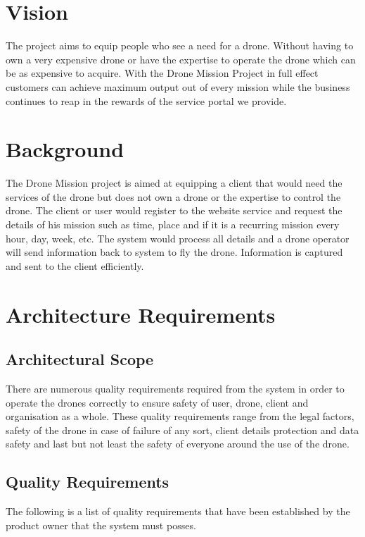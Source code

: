 \documentclass{article}
\begin{document}
	\section{Vision}%
	The project aims to equip people who see a need for a drone. Without having to own a very expensive drone or have the expertise to operate the drone which can be as expensive to acquire. With the Drone Mission Project in full effect customers can achieve maximum output out of every mission while the business continues to reap in the rewards of the service portal we provide.
	
	
	\section{Background} %
	The Drone Mission project is aimed at equipping a client that would need the services of the drone but does not own a drone or the expertise to control the drone. The client or user would register to the website service and request the details of his mission such as time, place and if it is a recurring mission every hour, day, week, etc. The system would process all details and a drone operator will send information back to system to fly the drone. Information is captured and sent to the client efficiently.
	\newpage
	
	\section{Architecture Requirements}%
	\subsection{Architectural Scope}%
	There are numerous quality requirements required from the system in order to operate the drones correctly to ensure safety of user, drone, client and organisation as a whole. These quality requirements range from the legal factors, safety of the drone in case of failure of any sort, client details protection and data safety and last but not least the safety of everyone around the use of the drone.
	
	\setlength{\leftskip}{45px}
		
	\subsection{Quality Requirements}%
	The following is a list of quality requirements that have been established by the product owner that the system must posses.
	\setlength{\leftskip}{61px}
	
\end{document}
